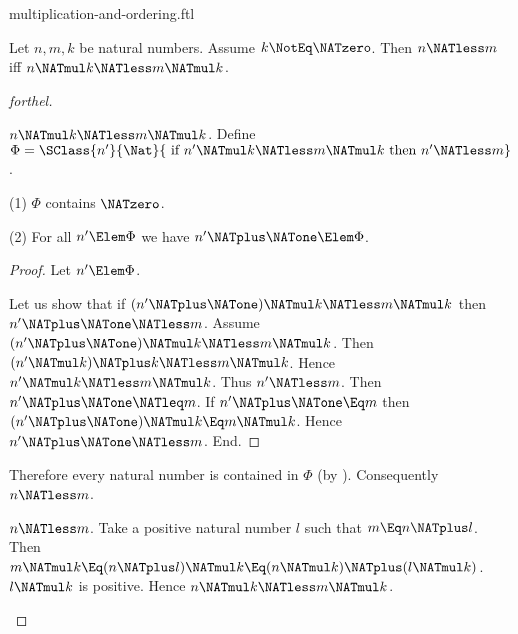 \documentclass{stex}
\begin{document}
\begin{smodule}{multiplication-and-ordering.ftl}


\begin{proposition}[forthel,name=preservation of ordering under right-multiplication]
  Let $n, m, k$ be natural numbers.
  Assume $k \NotEq \NATzero$.
  Then $n \NATless m$ iff $n \NATmul k \NATless m \NATmul k$.
\end{proposition}
\begin{proof}[forthel]
  \begin{case}{$n \NATmul k \NATless m \NATmul k$.}
    Define $\Phi = \SClass{n'}{\Nat}{\text{ if }n' \NATmul k \NATless m \NATmul k\text{ then }n' \NATless m}$.

    (1) $\Phi$ contains $\NATzero$.

    (2) For all $n' \Elem \Phi$ we have $n' \NATplus \NATone \Elem \Phi$.
    \begin{proof}
      Let $n' \Elem \Phi$.

      Let us show that if $(n' \NATplus \NATone) \NATmul k \NATless m \NATmul k$ then $n' \NATplus \NATone \NATless m$.
        Assume $(n' \NATplus \NATone) \NATmul k \NATless m \NATmul k$.
        Then $(n' \NATmul k) \NATplus k \NATless m \NATmul k$.
        Hence $n' \NATmul k \NATless m \NATmul k$.
        Thus $n' \NATless m$.
        Then $n' \NATplus \NATone \NATleq m$.
        If $n' \NATplus \NATone \Eq m$ then $(n' \NATplus \NATone) \NATmul k \Eq m \NATmul k$.
        Hence $n' \NATplus \NATone \NATless m$.
      End.
    \end{proof}

    Therefore every natural number is contained in $\Phi$ (by ).
    Consequently $n \NATless m$.
  \end{case}

  \begin{case}{$n \NATless m$.}
    Take a positive natural number $l$ such that $m \Eq n \NATplus l$.
    Then $m \NATmul k \Eq (n \NATplus l) \NATmul k \Eq (n \NATmul k) \NATplus (l \NATmul k)$.
    $l \NATmul k$ is positive.
    Hence $n \NATmul k \NATless m \NATmul k$.
  \end{case}
\end{proof}



\end{smodule}
\end{document}

